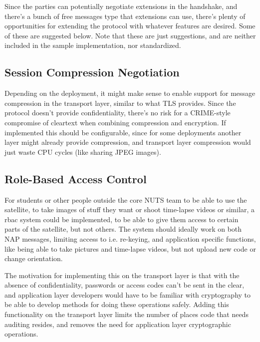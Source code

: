 Since the parties can potentially negotiate extensions in the handshake, and there's a bunch of free messages type that extensions can use, there's plenty of opportunities for extending the protocol with whatever features are desired. Some of these are suggested below. Note that these are just suggestions, and are neither included in the sample implementation, nor standardized.


    \subsection{Session Compression Negotiation}

Depending on the deployment, it might make sense to enable support for message compression in the transport layer, similar to what TLS provides. Since the protocol doesn't provide confidentiality, there's no risk for a CRIME-style compromise of cleartext when combining compression and encryption. If implemented this should be configurable, since for some deployments another layer might already provide compression, and transport layer compression would just waste CPU cycles (like sharing JPEG images).


    \subsection{Role-Based Access Control}

For students or other people outside the core NUTS team to be able to use the satellite, to take images of stuff they want or shoot time-lapse videos or similar, a \gls{rbac} system could be implemented, to be able to give them access to certain parts of the satellite, but not others. The system should ideally work on both NAP messages, limiting access to i.e. re-keying, and application specific functions, like being able to take pictures and time-lapse videos, but not upload new code or change orientation.

The motivation for implementing this on the transport layer is that with the absence of confidentiality, passwords or access codes can't be sent in the clear, and application layer developers would have to be familiar with cryptography to be able to develop methods for doing these operations safely. Adding this functionality on the transport layer limits the number of places code that needs auditing resides, and removes the need for application layer cryptographic operations.
